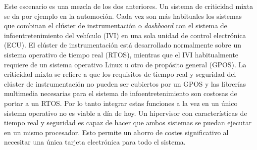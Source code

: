 \begin{itemize}
	Este escenario es una mezcla de los dos anteriores. Un sistema de criticidad mixta se da por ejemplo en la automoción. Cada vez son más habituales los sistemas que combinan el clúster de instrumentación o \textit{dashboard} con el sistema de infoentretenimiento del vehículo (\acrshort{IVI}) en una sola unidad de control electrónica (ECU). El clúster de instrumentación está desarrollado normalmente sobre un sistema operativo de tiempo real (\acrshort{RTOS}), mientras que el \acrshort{IVI} habitualmente requiere de un sistema operativo Linux u otro de propósito general (\acrshort{GPOS}). La criticidad mixta se refiere a que los requisitos de tiempo real y seguridad del clúster de instrumentación no pueden ser cubiertos por un \acrshort{GPOS} y las librerías multimedia necesarias para el sistema de infoentretenimiento son costosas de portar a un \acrshort{RTOS}. Por lo tanto integrar estas funciones a la vez en un único sistema operativo no es viable a día de hoy. Un hipervisor con características de tiempo real y seguridad es capaz de hacer que ambos sistemas se puedan ejecutar en un mismo procesador. Esto permite un ahorro de costes significativo al necesitar una única tarjeta electrónica para todo el sistema.\\
\end{itemize}

